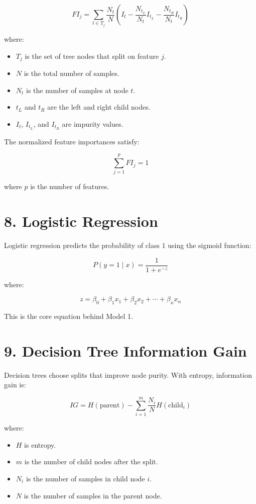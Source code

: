 \documentclass[11pt]{article}
\begin{document}
\[
FI_j =
\sum_{t \in T_j}
\frac{N_t}{N}
\left(
I_t
- \frac{N_{t_L}}{N_t} I_{t_L}
- \frac{N_{t_R}}{N_t} I_{t_R}
\right)
\]

\noindent where:

\begin{itemize}
    \item \(T_j\) is the set of tree nodes that split on feature \(j\).
    \item \(N\) is the total number of samples.
    \item \(N_t\) is the number of samples at node \(t\).
    \item \(t_L\) and \(t_R\) are the left and right child nodes.
    \item \(I_t\), \(I_{t_L}\), and \(I_{t_R}\) are impurity values.
\end{itemize}

\noindent The normalized feature importances satisfy:

\[
\sum_{j=1}^{p} FI_j = 1
\]

\noindent where \(p\) is the number of features.

\section*{8. Logistic Regression}

Logistic regression predicts the probability of class \(1\) using the sigmoid
function:

\[
P(y = 1 \mid x) =
\frac{1}{1 + e^{-z}}
\]

\noindent where:

\[
z =
\beta_0 + \beta_1 x_1 + \beta_2 x_2 + \cdots + \beta_n x_n
\]

\noindent This is the core equation behind Model 1.

\section*{9. Decision Tree Information Gain}

Decision trees choose splits that improve node purity. With entropy, information
gain is:

\[
IG =
H(\text{parent})
- \sum_{i=1}^{m}
\frac{N_i}{N}
H(\text{child}_i)
\]

\noindent where:

\begin{itemize}
    \item \(H\) is entropy.
    \item \(m\) is the number of child nodes after the split.
    \item \(N_i\) is the number of samples in child node \(i\).
    \item \(N\) is the number of samples in the parent node.
\end{itemize}
\end{document}
